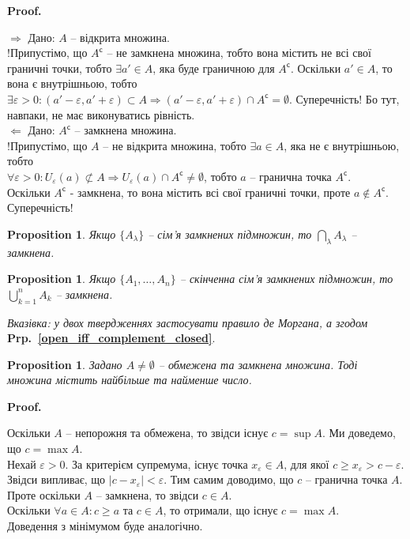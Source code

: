 \documentclass[a4paper, 14pt]{article}
\makeatletter
\def\qed{$\blacksquare$}
\def\rightproof{$\boxed{\Rightarrow}$ }
\def\leftproof{$\boxed{\Leftarrow}$ }
\theoremstyle{theoremdd}
\theoremstyle{theoremdd}
\theoremstyle{theoremdd}
\theoremstyle{theoremdd}
\theoremstyle{theoremdd}
\newtheorem{proposition}[theorem]{Proposition}
\theoremstyle{theoremdd}
\theoremstyle{theoremdd}
\theoremstyle{theoremdd}
\renewenvironment{proof}[1][Proof.\\]{\par
\pushQED{\hfill \qed}%
\normalfont \topsep6\p@\@plus6\p@\relax
\trivlist
\item\relax
{\bfseries
#1\@addpunct{.}}\hspace\labelsep\ignorespaces
}{%
\popQED\endtrivlist\@endpefalse
}
\newcommand\prpref[1]{\textbf{Prp.~\ref{#1}}}
\makeatother
\begin{document}
\begin{proof}
\rightproof Дано: $A$ -- відкрита множина.\\
!Припустімо, що $A^\mathsf{c}$ -- не замкнена множина, тобто вона містить не всі свої граничні точки, тобто $\exists a' \in A$, яка буде граничною для $A^\mathsf{c}$. Оскільки $a' \in A$, то вона є внутрішньою, тобто $\exists \varepsilon > 0: (a'-\varepsilon,a'+\varepsilon) \subset A \Rightarrow (a'-\varepsilon,a'+\varepsilon) \cap A^\mathsf{c} = \emptyset$. Суперечність! Бо тут, навпаки, не має виконуватись рівність.
\bigskip \\
\leftproof Дано: $A^\mathsf{c}$ -- замкнена множина.\\
!Припустімо, що $A$ -- не відкрита множина, тобто $\exists a \in A$, яка не є внутрішньою, тобто\\
$\forall \varepsilon > 0: U_{\varepsilon}(a) \not\subset A \Rightarrow U_{\varepsilon}(a) \cap A^\mathsf{c} \neq \emptyset$, тобто $a$ -- гранична точка $A^\mathsf{c}$.\\
Оскільки $A^\mathsf{c}$ - замкнена, то вона містить всі свої граничні точки, проте $a \notin A^\mathsf{c}$. Суперечність!
\end{proof}

\begin{proposition}
Якщо $\{A_{\lambda}\}$ -- сім'я замкнених підмножин, то $\displaystyle \bigcap_{\lambda} A_{\lambda}$ -- замкнена.
\end{proposition}

\begin{proposition}
Якщо $\{A_1,\dots,A_n\}$ -- скінченна сім'я замкнених підмножин, то $\displaystyle\bigcup_{k=1}^n A_k$ -- замкнена.
\end{proposition}

\textit{Вказівка: у двох твердженнях застосувати правило де Моргана, а згодом } \prpref{open_iff_complement_closed}.

\begin{proposition}
Задано $A \neq \emptyset$ -- обмежена та замкнена множина. Тоді множина містить найбільше та найменше число. 
\end{proposition}

\begin{proof}
Оскільки $A$ -- непорожня та обмежена, то звідси існує $c = \sup A$. Ми доведемо, що $c = \max A$.\\
Нехай $\varepsilon > 0$. За критерієм супремума, існує точка $x_\varepsilon \in A$, для якої $c \geq x_\varepsilon > c - \varepsilon$. Звідси випливає, що $|c-x_\varepsilon| < \varepsilon$. Тим самим доводимо, що $c$ -- гранична точка $A$. Проте оскільки $A$ -- замкнена, то звідси $c \in A$.\\
Оскільки $\forall a \in A: c \geq a$ та $c \in A$, то отримали, що існує $c = \max A$.\\
Доведення з мінімумом буде аналогічно.
\end{proof}
\end{document}

